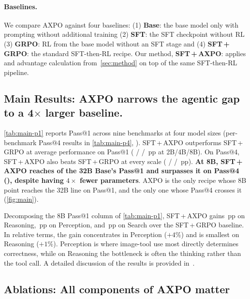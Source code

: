 \paragraph{Baselines.}
We compare AXPO against four baselines: (1) \textbf{Base}: the base model only with prompting without additional training (2) \textbf{SFT}: the SFT checkpoint without RL (3) \textbf{GRPO}: RL from the base model without an SFT stage and (4) \textbf{SFT\,+\,GRPO}: the standard SFT-then-RL recipe.
Our method, \textbf{SFT\,+\,AXPO}: applies \toolresample and advantage calculation from~\autoref{sec:method} on top of the same SFT-then-RL pipeline.

\subsection{Main Results: AXPO narrows the agentic gap to a 4$\times$ larger baseline.}
\label{sec:main-results}



\autoref{tab:main-p1} reports Pass@1 across nine benchmarks at four model sizes (per-benchmark Pass@4 results in \autoref{tab:main-p4}, ). SFT\,+\,AXPO outperforms SFT\,+\,GRPO at average performance on Pass@1 (\dPassOneTwoB{} / \dPassOneFourB{} / \dPassOneEightB\,pp at 2B/4B/8B). On Pass@4, SFT\,+\,AXPO also beats SFT\,+\,GRPO at every scale (\dPassFourTwoB{} / \dPassFourFourB{} / \dPassFourEightB\,pp). \textbf{At 8B, SFT\,+\,AXPO reaches \eightBPassOneReachPct{} of the 32B Base's Pass@1 and surpasses it on Pass@4 (\eightBvsAgentPassFour), despite having $4\times$ fewer parameters}. AXPO is the only recipe whose 8B point reaches the 32B line on Pass@1, and the only one whose Pass@4 crosses it (\autoref{fig:main}).

Decomposing the 8B Pass@1 column of \autoref{tab:main-p1}, SFT\,+\,AXPO gains \dReasoningEightB\,pp on Reasoning, \dPerceptionEightB\,pp on Perception, and \dSearchEightB\,pp on Search over the SFT\,+\,GRPO baseline.
In relative terms, the gain concentrates in Perception ($+4\%$) and is smallest on Reasoning ($+1\%$). Perception is where image-tool use most directly determines correctness, while on Reasoning the bottleneck is often the thinking rather than the tool call.
A detailed discussion of the results is provided in~.


\subsection{Ablations: All components of AXPO matter}
\label{sec:ablations}

